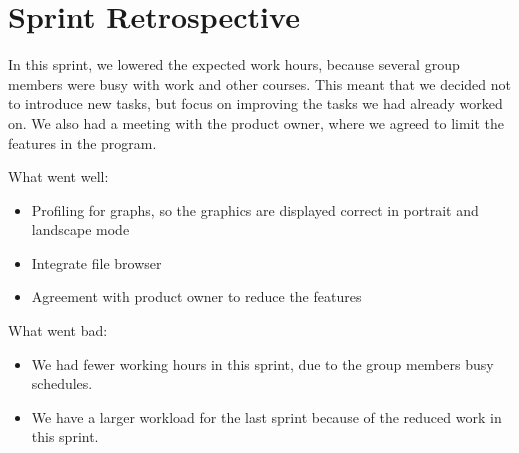 \section{Sprint Retrospective} %
\label{sec:Sprint Retrospective}

In this sprint, we lowered the expected work hours, because several group members were busy with work and other courses. This meant that we decided not to introduce new tasks, but focus on improving the tasks we had already worked on.
We also had a meeting with the product owner, where we agreed to limit the features in the program.

What went well:

\begin{itemize}
	\item Profiling for graphs, so the graphics are displayed correct in portrait and landscape mode
	\item Integrate file browser
	\item Agreement with product owner to reduce the features
\end{itemize}
What went bad:
\begin{itemize}
	\item We had fewer working hours in this sprint, due to the group members busy schedules.
	\item We have a larger workload for the last sprint because of the reduced work in this sprint.
\end{itemize}
